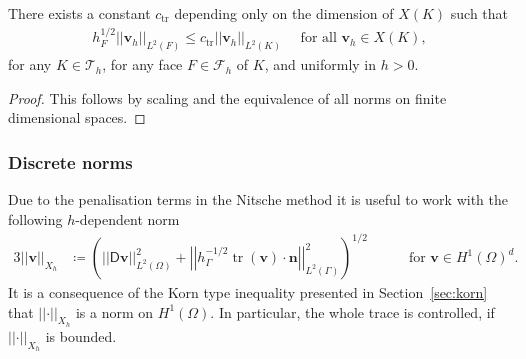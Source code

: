 \documentclass[reqno,a4paper]{amsart}
\def\norm#1{\left|\!\left| #1 \right|\!\right|}
\def\tens#1{\pmb{\mathsf{#1}}}
\def\vec#1{\boldsymbol{#1}}
\def\tr{\mathop{\mathrm{tr}}\nolimits}
\def\Dv{\BD\bv}
\def\bn{\vec{n}}
\def\bv{\vec{v}}
\def\BD{\tens{D}}
\def\tria{\mathcal{T}_h}
\def\faces{\mathcal{F}_h}
\begin{document}
\begin{lemma}
	\label{lem:trace-inverse}
	There exists a constant $c_{\tr}$ depending only on the dimension of $X(K)$ such that 
	\begin{align*}
		h_F^{1/2} \norm{\bv_h}_{L^2(F)} 
		\leq c_{\tr}
		\norm{\bv_h}_{L^2(K)} \quad \text{ for all } \bv_h\in  X(K),
	\end{align*}
	for any $K \in \tria$, for any face $F \in \faces$ of $K$, and uniformly in $h>0$. 	
\end{lemma}
\begin{proof} This follows by  scaling and the equivalence of all norms on finite dimensional spaces. 
\end{proof}

\subsubsection*{Discrete norms}
Due to the penalisation terms in the Nitsche method it is useful to work with the following $h$-dependent norm
\begin{alignat}{3}\label{def:norm-h}
	\norm{\bv}_{X_h} 
	&
	\coloneqq
	\left(  
	\norm{\Dv}_{L^2(\Omega)}^2 
	+ \norm{h_{\Gamma}^{-1/2} \tr(\bv)\cdot \bn}_{L^2(\Gamma)}^2 \right)^{1/2} 
	\quad 
	&&\text{ for } \bv \in H^1(\Omega)^d.
\end{alignat}
It is a consequence of the Korn type inequality presented in Section~\ref{sec:korn} that $\norm{\cdot}_{X_h}$ is a norm on $H^1(\Omega)$. 
In particular, the whole trace is controlled, if $\norm{\cdot}_{X_h}$ is bounded. 
\end{document}
